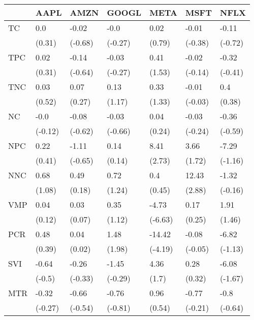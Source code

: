\begin{tabular}{lllllll}
\toprule
{} &     AAPL &     AMZN &    GOOGL &     META &     MSFT &     NFLX \\
\midrule
TC  &      0.0 &    -0.02 &     -0.0 &     0.02 &    -0.01 &    -0.11 \\
    &   (0.31) &  (-0.68) &  (-0.27) &   (0.79) &  (-0.38) &  (-0.72) \\
TPC &     0.02 &    -0.14 &    -0.03 &     0.41 &    -0.02 &    -0.32 \\
    &   (0.31) &  (-0.64) &  (-0.27) &   (1.53) &  (-0.14) &  (-0.41) \\
TNC &     0.03 &     0.07 &     0.13 &     0.33 &    -0.01 &      0.4 \\
    &   (0.52) &   (0.27) &   (1.17) &   (1.33) &  (-0.03) &   (0.38) \\
NC  &     -0.0 &    -0.08 &    -0.03 &     0.04 &    -0.03 &    -0.36 \\
    &  (-0.12) &  (-0.62) &  (-0.66) &   (0.24) &  (-0.24) &  (-0.59) \\
NPC &     0.22 &    -1.11 &     0.14 &     8.41 &     3.66 &    -7.29 \\
    &   (0.41) &  (-0.65) &   (0.14) &   (2.73) &   (1.72) &  (-1.16) \\
NNC &     0.68 &     0.49 &     0.72 &      0.4 &    12.43 &    -1.32 \\
    &   (1.08) &   (0.18) &   (1.24) &   (0.45) &   (2.88) &  (-0.16) \\
VMP &     0.04 &     0.03 &     0.35 &    -4.73 &     0.17 &     1.91 \\
    &   (0.12) &   (0.07) &   (1.12) &  (-6.63) &   (0.25) &   (1.46) \\
PCR &     0.48 &     0.04 &     1.48 &   -14.42 &    -0.08 &    -6.82 \\
    &   (0.39) &   (0.02) &   (1.98) &  (-4.19) &  (-0.05) &  (-1.13) \\
SVI &    -0.64 &    -0.26 &    -1.45 &     4.36 &     0.28 &    -6.08 \\
    &   (-0.5) &  (-0.33) &  (-0.29) &    (1.7) &   (0.32) &  (-1.67) \\
MTR &    -0.32 &    -0.66 &    -0.76 &     0.96 &    -0.77 &     -0.8 \\
    &  (-0.27) &  (-0.54) &  (-0.81) &   (0.54) &  (-0.21) &  (-0.64) \\
\bottomrule
\end{tabular}
